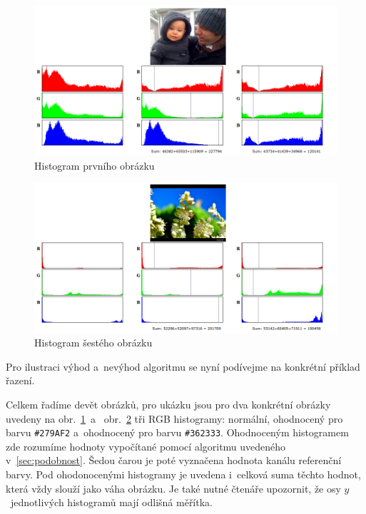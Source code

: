\documentclass[12pt,oneside,a4paper]{article}
\begin{document}
\begin{figure} \begin{center}
\includegraphics[width=13.5cm]{figs/histogram1.png} \caption{Histogram prvního obrázku}
\label{fig:manchild}
\end{center} \end{figure}
\begin{figure} \begin{center}
\includegraphics[width=13.5cm]{figs/histogram6.png} \caption{Histogram šestého obrázku}
\label{fig:borderflower}
\end{center} \end{figure}
Pro ilustraci výhod a~nevýhod algoritmu se nyní podívejme na konkrétní příklad řazení.

Celkem řadíme devět obrázků, pro ukázku jsou pro dva konkrétní obrázky uvedeny na obr.~\ref{fig:manchild}~a~ obr.~\ref{fig:borderflower} tři RGB histogramy: normální, ohodnocený pro barvu \verb|#279AF2| a~ohodnocený pro barvu \verb|#362333|. Ohodnoceným histogramem zde rozumíme hodnoty vypočítané pomocí algoritmu uvedeného v~\ref{sec:podobnost}. Šedou čarou je poté vyznačena hodnota kanálu referenční barvy. Pod ohodonocenými histogramy je uvedena i~celková suma těchto hodnot, která vždy slouží jako váha obrázku. Je také nutné čtenáře upozornit, že osy $y$~jednotlivých histogramů mají odlišná měřítka.
\end{document}

